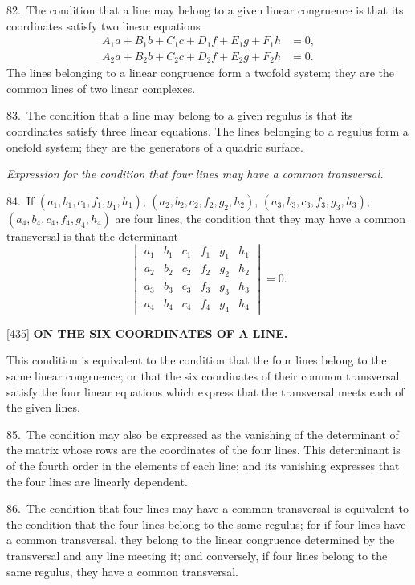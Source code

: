 \documentclass[12pt,a4paper]{article}
\newcommand{\paperref}[1]{\textup{[#1]}}
\theoremstyle{definition}
\begin{document}
82.~The condition that a line may belong to a given linear congruence is that its coordinates satisfy two linear equations
\begin{align*}
A_1 a + B_1 b + C_1 c + D_1 f + E_1 g + F_1 h &= 0,\\
A_2 a + B_2 b + C_2 c + D_2 f + E_2 g + F_2 h &= 0.
\end{align*}
The lines belonging to a linear congruence form a twofold system; they are the common lines of two linear complexes.

83.~The condition that a line may belong to a given regulus is that its coordinates satisfy three linear equations. The lines belonging to a regulus form a onefold system; they are the generators of a quadric surface.

\textit{Expression for the condition that four lines may have a common transversal.}

84.~If $(a_1, b_1, c_1, f_1, g_1, h_1)$, $(a_2, b_2, c_2, f_2, g_2, h_2)$, $(a_3, b_3, c_3, f_3, g_3, h_3)$, $(a_4, b_4, c_4, f_4, g_4, h_4)$ are four lines, the condition that they may have a common transversal is that the determinant
\[
\begin{vmatrix}
a_1 & b_1 & c_1 & f_1 & g_1 & h_1 \\
a_2 & b_2 & c_2 & f_2 & g_2 & h_2 \\
a_3 & b_3 & c_3 & f_3 & g_3 & h_3 \\
a_4 & b_4 & c_4 & f_4 & g_4 & h_4
\end{vmatrix}
= 0.
\]

\newpage
\setcounter{page}{96}

\noindent\paperref{435}\quad
\textbf{ON THE SIX COORDINATES OF A LINE.}

This condition is equivalent to the condition that the four lines belong to the same linear congruence; or that the six coordinates of their common transversal satisfy the four linear equations which express that the transversal meets each of the given lines.

85.~The condition may also be expressed as the vanishing of the determinant of the matrix whose rows are the coordinates of the four lines. This determinant is of the fourth order in the elements of each line; and its vanishing expresses that the four lines are linearly dependent.

86.~The condition that four lines may have a common transversal is equivalent to the condition that the four lines belong to the same regulus; for if four lines have a common transversal, they belong to the linear congruence determined by the transversal and any line meeting it; and conversely, if four lines belong to the same regulus, they have a common transversal.
\end{document}
